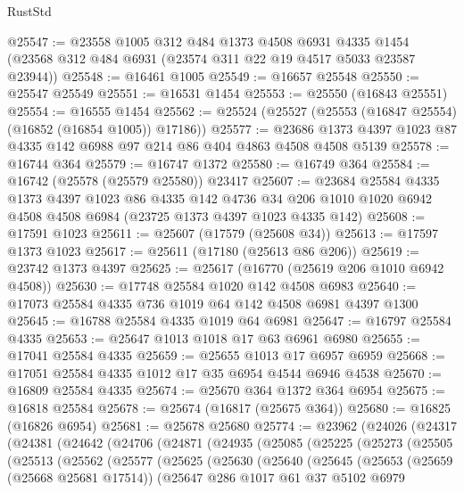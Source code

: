 \begin{lexlean}{RustStd}
\begin{coremodule}
@25547 := @23558
    @1005
    @312
    @484
    @1373
    @4508
    @6931
    @4335
    @1454
    (@23568 @312 @484 @6931 (@23574 @311 @22 @19 @4517 @5033 @23587 @23944))
@25548 := @16461 @1005
@25549 := @16657 @25548
@25550 := @25547 @25549
@25551 := @16531 @1454
@25553 := @25550 (@16843 @25551)
@25554 := @16555 @1454
@25562 := @25524 (@25527 (@25553 (@16847 @25554) (@16852 (@16854 @1005)) @17186))
@25577 := @23686 @1373 @4397 @1023 @87 @4335 @142 @6988 @97 @214 @86 @404 @4863 @4508 @4508 @5139
@25578 := @16744 @364
@25579 := @16747 @1372
@25580 := @16749 @364
@25584 := @16742 (@25578 (@25579 @25580)) @23417
@25607 := @23684
    @25584
    @4335
    @1373
    @4397
    @1023
    @86
    @4335
    @142
    @4736
    @34
    @206
    @1010
    @1020
    @6942
    @4508
    @4508
    @6984
    (@23725 @1373 @4397 @1023 @4335 @142)
@25608 := @17591 @1023
@25611 := @25607 (@17579 (@25608 @34))
@25613 := @17597 @1373 @1023
@25617 := @25611 (@17180 (@25613 @86 @206))
@25619 := @23742 @1373 @4397
@25625 := @25617 (@16770 (@25619 @206 @1010 @6942 @4508))
@25630 := @17748 @25584 @1020 @142 @4508 @6983
@25640 := @17073 @25584 @4335 @736 @1019 @64 @142 @4508 @6981 @4397 @1300
@25645 := @16788 @25584 @4335 @1019 @64 @6981
@25647 := @16797 @25584 @4335
@25653 := @25647 @1013 @1018 @17 @63 @6961 @6980
@25655 := @17041 @25584 @4335
@25659 := @25655 @1013 @17 @6957 @6959
@25668 := @17051 @25584 @4335 @1012 @17 @35 @6954 @4544 @6946 @4538
@25670 := @16809 @25584 @4335
@25674 := @25670 @364 @1372 @364 @6954
@25675 := @16818 @25584
@25678 := @25674 (@16817 (@25675 @364))
@25680 := @16825 (@16826 @6954)
@25681 := @25678 @25680
@25774 := @23962
    (@24026
      (@24317
        (@24381
          (@24642
            (@24706
              (@24871
                (@24935
                  (@25085
                    (@25225
                      (@25273
                        (@25505
                          (@25513
                            (@25562
                              (@25577
                                (@25625
                                  (@25630
                                    (@25640
                                      (@25645
                                        (@25653
                                          (@25659 (@25668 @25681 @17514))
                                          (@25647
                                            @286
                                            @1017
                                            @61
                                            @37
                                            @5102
                                            @6979

\end{coremodule}
\end{lexlean}
